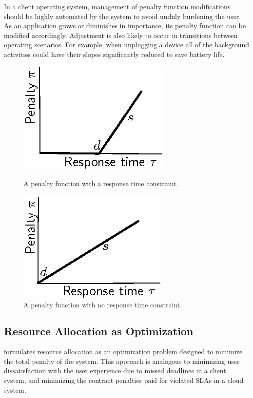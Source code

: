 In a client operating system, management of penalty function modifications
should be highly automated by the system to avoid unduly burdening the user.
As an application grows or diminishes in importance, its penalty function can be modified accordingly.
Adjustment is also likely to occur in transitions between operating scenarios.
For example, when unplugging a device all of the background activities could have their slopes significantly reduced to save battery life.

\begin{figure}[hb]
\parbox{1.6in}{
\includegraphics*{Figures/Penalty1.eps}
\caption{\label{f:pen1}A penalty function with a response time constraint.}
}
\hspace{\fill}
\parbox{1.6in}{
\includegraphics*{Figures/Penalty2.eps}
\caption{\label{f:pen2}A penalty function with no response time constraint.}
}
\end{figure}

\subsection{Resource Allocation as Optimization}

\pacora formulates resource allocation as an optimization problem
designed to minimize the total penalty of the system. This approach is
analogous to minimizing user dissatisfaction with the user experience
due to missed deadlines in a client system, and minimizing the contract
penalties paid for violated SLAs in a cloud
system.

